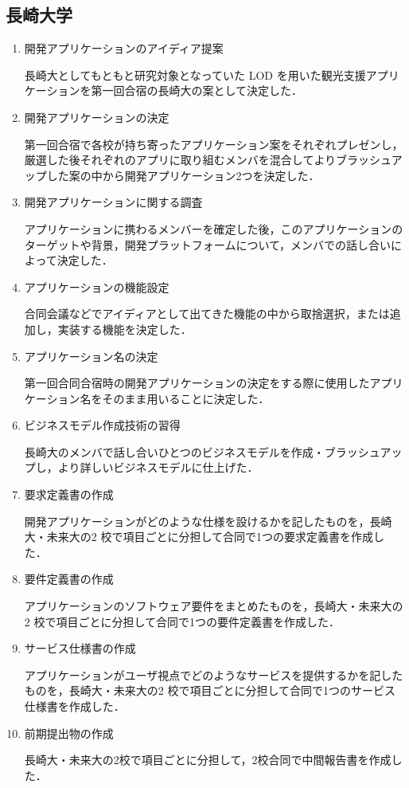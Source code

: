 \subsection{長崎大学}
\begin{enumerate}
\item 開発アプリケーションのアイディア提案 
\par 長崎大としてもともと研究対象となっていた LOD を用いた観光支援アプリケーションを第一回合宿の長崎大の案として決定した．
\item 開発アプリケーションの決定 
\par 第一回合宿で各校が持ち寄ったアプリケーション案をそれぞれプレゼンし，厳選した後それぞれのアプリに取り組むメンバを混合してよりブラッシュアップした案の中から開発アプリケーション2つを決定した． 
\item 開発アプリケーションに関する調査 
\par  アプリケーションに携わるメンバーを確定した後，このアプリケーションのターゲットや背景，開発プラットフォームについて，メンバでの話し合いによって決定した．
\item アプリケーションの機能設定 
\par 合同会議などでアイディアとして出てきた機能の中から取捨選択，または追加し，実装する機能を決定した． 
\item アプリケーション名の決定 
\par 第一回合同合宿時の開発アプリケーションの決定をする際に使用したアプリケーション名をそのまま用いることに決定した．
\item ビジネスモデル作成技術の習得 
\par 長崎大のメンバで話し合いひとつのビジネスモデルを作成・ブラッシュアップし，より詳しいビジネスモデルに仕上げた．
\item 要求定義書の作成 
\par 開発アプリケーションがどのような仕様を設けるかを記したものを，長崎大・未来大の2 校で項目ごとに分担して合同で1つの要求定義書を作成した． 
\item 要件定義書の作成 
\par アプリケーションのソフトウェア要件をまとめたものを，長崎大・未来大の2 校で項目ごとに分担して合同で1つの要件定義書を作成した． 
\item サービス仕様書の作成 
\par アプリケーションがユーザ視点でどのようなサービスを提供するかを記したものを，長崎大・未来大の2 校で項目ごとに分担して合同で1つのサービス仕様書を作成した．
\item 前期提出物の作成 
\par 長崎大・未来大の2校で項目ごとに分担して，2校合同で中間報告書を作成した． 
\end{enumerate}
